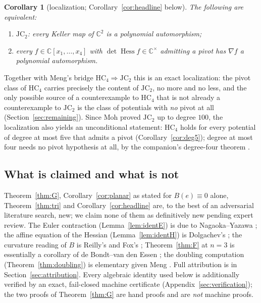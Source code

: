 \documentclass[11pt]{article}
\theoremstyle{plain}
\newtheorem{corollary}[theorem]{Corollary}
\theoremstyle{definition}
\newcommand{\C}{\mathbb{C}}
\newcommand{\Hess}{\operatorname{Hess}}
\newcommand{\HC}{\mathrm{HC}}
\newcommand{\JC}{\mathrm{JC}}
\begin{document}
\begin{corollary}[localization; Corollary~\ref{cor:headline} below]
The following are equivalent:
\begin{enumerate}
\item[\rm(a)] $\JC_2$: every Keller map of $\C^2$ is a polynomial
automorphism;
\item[\rm(b)] every $f\in\C[x_1,\dots,x_4]$ with $\det\Hess f\in
\C^{\times}$ admitting a pivot has $\nabla f$ a polynomial automorphism.
\end{enumerate}
\end{corollary}

Together with Meng's bridge $\HC_4\Rightarrow\JC_2$ this is an exact
localization: the pivot class of $\HC_4$ carries precisely the content of
$\JC_2$, no more and no less, and the only possible source of a
counterexample to $\HC_4$ that is not already a counterexample to $\JC_2$
is the class of potentials with \emph{no} pivot at all
(Section~\ref{sec:remaining}). Since Moh \cite{Moh} proved $\JC_2$ up to
degree $100$, the localization also yields an unconditional statement:
$\HC_4$ holds for every potential of degree at most five that admits a
pivot (Corollary~\ref{cor:deg5}); degree at most four needs no pivot
hypothesis at all, by the companion's degree-four theorem
\cite{companion}.

\subsection{What is claimed and what is not}

Theorem~\ref{thm:G}, Corollary~\ref{cor:planar} as stated for
$B(e)\equiv0$ alone, Theorem~\ref{thm:tri} and
Corollary~\ref{cor:headline} are, to the best of an adversarial
literature search, new; we claim none of them as definitively new pending
expert review. The Euler contraction (Lemma~\ref{lem:identE}) is due to
Nagaoka--Yazawa \cite{NY}; the affine equation of the Hessian
(Lemma~\ref{lem:identH}) is Dolgachev's \cite{Dolgachev}; the curvature
reading of $B$ is Reilly's and Fox's \cite{Reilly,Fox2017};
Theorem~\ref{thm:F} at $n=3$ is essentially a corollary of de Bondt--van
den Essen \cite{dBvdE}; the doubling computation
(Theorem~\ref{thm:doubling}) is elementary given Meng \cite{Meng2006}.
Full attribution is in Section~\ref{sec:attribution}. Every algebraic
identity used below is additionally verified by an exact, fail-closed
machine certificate (Appendix~\ref{sec:verification}); the two proofs of
Theorem~\ref{thm:G} are hand proofs and are \emph{not} machine proofs.
\end{document}
